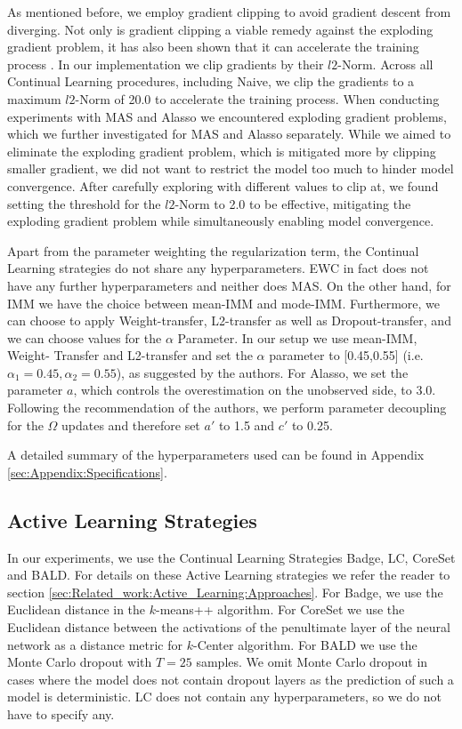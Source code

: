 As mentioned before, we employ gradient clipping to avoid gradient descent from diverging. Not only is gradient clipping a viable remedy against the exploding
gradient problem, it has also been shown that it can accelerate the training process \cite{zhang2019gradient}. In our implementation we clip gradients by their
$l2$-Norm. Across all Continual Learning procedures, including Naive, we clip the gradients to a maximum $l2$-Norm of 20.0 to accelerate the training process.
When conducting experiments with MAS and Alasso we encountered exploding gradient problems, which we further investigated for MAS and Alasso separately. While we
aimed to eliminate the exploding gradient problem, which is mitigated more by clipping smaller gradient, we did not want to restrict the model too much to hinder 
model convergence. After carefully exploring with different values to clip at, we found setting the threshold for the $l2$-Norm to 2.0 to be effective, mitigating
the exploding gradient problem while simultaneously enabling model convergence. \par
Apart from the parameter weighting the regularization term, the Continual Learning strategies do not share any hyperparameters. EWC in fact does not have
any further hyperparameters and neither does MAS. On the other hand, for IMM we have the choice between mean-IMM and mode-IMM. Furthermore, we can choose
to apply Weight-transfer, L2-transfer as well as Dropout-transfer, and we can choose values for the $\alpha$ Parameter. In our setup we use mean-IMM, Weight-
Transfer and L2-transfer and set the $\alpha$ parameter to [0.45,0.55] (i.e. $\alpha_1 = 0.45, \alpha_2 = 0.55$), as suggested by the authors. For Alasso, we set
the parameter $a$, which controls the overestimation on the unobserved side, to 3.0. Following the recommendation of the authors, we perform parameter decoupling
for the $\Omega$ updates and therefore set $a'$ to 1.5 and $c'$ to 0.25. \par
A detailed summary of the hyperparameters used can be found in Appendix \ref{sec:Appendix:Specifications}.


\subsection{Active Learning Strategies}
\label{sec:ExperimentSetup:ALStrategies}
In our experiments, we use the Continual Learning Strategies Badge, LC, CoreSet and BALD. For details on these Active Learning strategies we refer
the reader to section \ref{sec:Related_work:Active_Learning:Approaches}. For Badge, we use the Euclidean distance in the $k$-means++ algorithm.
For CoreSet we use the Euclidean distance between the activations of the penultimate layer of the neural network as a distance metric for $k$-Center
algorithm. For BALD we use the Monte Carlo dropout with $T=25$ samples. We omit Monte Carlo dropout in cases where the model does not contain dropout
layers as the prediction of such a model is deterministic. LC does not contain any hyperparameters, so we do not have to specify any.

